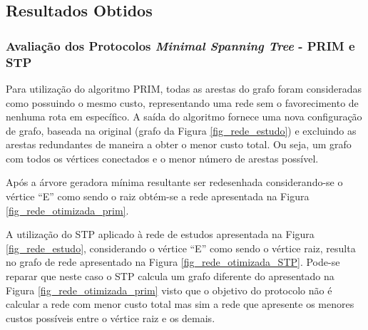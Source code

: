 \documentclass[12pt]{article}
\begin{document}
\subsection{Resultados Obtidos}
\label{sec:resultados}
\subsubsection{Avaliação dos Protocolos \emph{Minimal Spanning Tree} - PRIM e STP}
\label{sec:minimal_spanning_tree}
Para utilização do algoritmo PRIM, todas as arestas do grafo foram consideradas como possuindo o mesmo custo, representando uma rede sem o favorecimento de nenhuma rota em específico. A saída do algoritmo fornece uma nova configuração de grafo, baseada na original (grafo da Figura \ref{fig_rede_estudo}) e excluindo as arestas redundantes de maneira a obter o menor custo total. Ou seja, um grafo com todos os vértices conectados e o menor número de arestas possível.

Após a árvore geradora mínima resultante ser redesenhada considerando-se o vértice ``E'' como sendo o raiz obtém-se a rede apresentada na Figura \ref{fig_rede_otimizada_prim}.


A utilização do STP aplicado à rede de estudos apresentada na Figura \ref{fig_rede_estudo}, considerando o vértice ``E'' como sendo o vértice raiz, resulta no grafo de rede apresentado na Figura \ref{fig_rede_otimizada_STP}. Pode-se reparar que neste caso o STP calcula um grafo diferente do apresentado na Figura \ref{fig_rede_otimizada_prim} visto que o objetivo do protocolo não é calcular a rede com menor custo total mas sim a rede que apresente os menores custos possíveis entre o vértice raiz e os demais.
\end{document}
